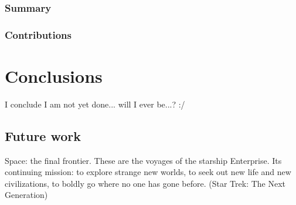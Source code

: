 \documentclass[showtrims]{kthesis}
\newcommand*\VerBar[1]{%
	\begin{tikzpicture}
	\fill[#1] (0,0)--(1,0)--(1,1)--(0,1)--cycle;
	\draw[white] (0.5,0.5)node{\rotatebox{-90}{\Huge \textbf \thechapter}};
	\end{tikzpicture}
}
\newcounter{DogearHShift}
\newcommand{\dogear}[1]{%
  \backgroundsetup{position={current page.north east},vshift=0.5cm,%
    hshift=-\theDogearHShift cm,contents={\VerBar{#1}}}%
  \BgThispage%
  \addtocounter{DogearHShift}{1}
}
\newcommand{\dogearRGB}[1]{%
  \definecolor{dogearColor}{RGB}{#1}%
  \dogear{dogearColor}%
}
\begin{document}
\subsection{Summary}
\subsection{Contributions}


\chapter{Conclusions}
\renewcommand\thesection{\thechapter.\arabic{section}}
I conclude I am not yet done... will I ever be...? :/

\section{Future work}
Space: the final frontier. These are the voyages of the starship Enterprise. Its 
continuing mission: to explore strange new worlds, to seek out new life and new 
civilizations, to boldly go where no one has gone before. (Star Trek: The Next Generation)





\end{document}
